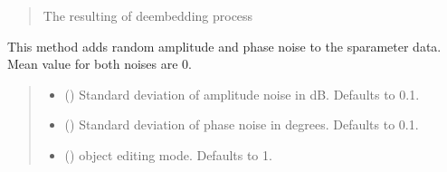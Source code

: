 \documentclass[letterpaper,10pt,english]{sphinxmanual}
\begin{document}
\begin{fulllineitems}
\begin{fulllineitems}
\begin{quote}
\begin{description}
\sphinxAtStartPar
The resulting of deembedding process

\sphinxAtStartPar
{\hyperref[\detokenize{touchstone:touchstone.spfile}]{}}

\end{description}\end{quote}

\end{fulllineitems}


\begin{fulllineitems}
\label{\detokenize{touchstone:touchstone.spfile.add_abs_noise}}
\pysigstartsignatures
{}
\pysigstopsignatures
\sphinxAtStartPar
This method adds random amplitude and phase noise to the s\sphinxhyphen{}parameter data.
Mean value for both noises are 0.
\begin{quote}\begin{description}
\begin{itemize}
\item {}
\sphinxAtStartPar
{} (\sphinxstyleliteralemphasis{\sphinxupquote{, }}) \textendash{} Standard deviation of amplitude noise in dB. Defaults to 0.1.

\item {}
\sphinxAtStartPar
{} (\sphinxstyleliteralemphasis{\sphinxupquote{, }}) \textendash{} Standard deviation of phase noise in degrees. Defaults to 0.1.

\item {}
\sphinxAtStartPar
{} (\sphinxstyleliteralemphasis{\sphinxupquote{, }}) \textendash{} object editing mode. Defaults to \sphinxhyphen{}1.


\end{itemize}
\end{description}
\end{quote}
\end{fulllineitems}
\end{fulllineitems}
\end{document}
